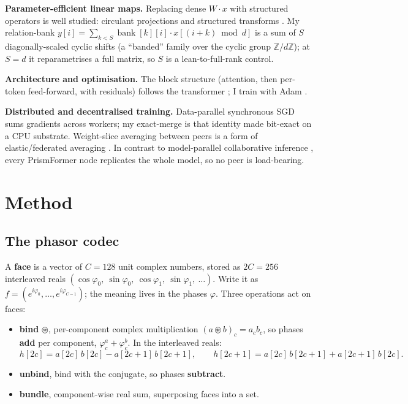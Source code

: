 \documentclass[11pt]{article}
\newcommand{\bind}{\mathbin{\circledast}}         %
\newcommand{\bank}{\operatorname{bank}}
\begin{document}
\textbf{Parameter-efficient linear maps.} Replacing dense $W\!\cdot\! x$ with structured operators is
well studied: circulant projections \parencite{cheng2015circulant} and structured transforms \parencite{sindhwani2015structured}. My relation-bank $y[i] = \sum_{k<S} \bank[k][i]\cdot x[(i+k)\bmod d]$ is a sum of $S$
diagonally-scaled cyclic shifts (a ``banded'' family over the cyclic group $\mathbb{Z}/d\mathbb{Z}$);
at $S=d$ it reparametrises a full matrix, so $S$ is a lean-to-full-rank control.

\textbf{Architecture and optimisation.} The block structure (attention, then per-token feed-forward,
with residuals) follows the transformer \parencite{vaswani2017attention}; I train with Adam \parencite{kingma2015adam}.

\textbf{Distributed and decentralised training.} Data-parallel synchronous SGD sums gradients across
workers; my exact-merge is that identity made bit-exact on a CPU substrate. Weight-slice averaging
between peers is a form of elastic/federated averaging \parencite{mcmahan2017fedavg}. In contrast to
model-parallel collaborative inference \parencite{borzunov2023petals}, every PrismFormer node replicates the
whole model, so no peer is load-bearing.

\section{Method}\label{sec:method}

\subsection{The phasor codec}\label{sec:codec}

A \textbf{face} is a vector of $C = 128$ unit complex numbers, stored as $2C = 256$ interleaved reals
$(\cos\varphi_0,\ \sin\varphi_0,\ \cos\varphi_1,\ \sin\varphi_1,\ \dots)$. Write it as
$f = (e^{i\varphi_0}, \dots, e^{i\varphi_{C-1}})$; the meaning lives in the phases $\varphi$. Three
operations act on faces:

\begin{itemize}
\item \textbf{bind} $\bind$, per-component complex multiplication $(a \bind b)_c = a_c b_c$, so phases
\textbf{add} per component, $\varphi^a_c + \varphi^b_c$. In the interleaved reals:
\[
h[2c] = a[2c]\,b[2c] - a[2c{+}1]\,b[2c{+}1], \qquad
h[2c{+}1] = a[2c]\,b[2c{+}1] + a[2c{+}1]\,b[2c].
\]
\item \textbf{unbind}, bind with the conjugate, so phases \textbf{subtract}.
\item \textbf{bundle}, component-wise real sum, superposing faces into a set.
\end{itemize}
\end{document}
